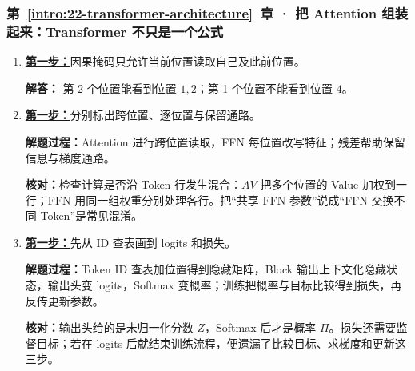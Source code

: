 \subsubsection*{第~\ref*{intro:22-transformer-architecture}~章 · 把 Attention 组装起来：Transformer 不只是一个公式}
\begin{enumerate}[label={},leftmargin=4.8em,itemsep=4pt]
\item[\textbf{C-067.}] \leavevmode{}\label{solution:C-067}\label{solution:causal-position-visibility}\hyperref[exercise:causal-position-visibility]{\textbf{第一步：}}因果掩码只允许当前位置读取自己及此前位置。\par\nobreak
\textbf{解答：} 第 2 个位置能看到位置 $1,2$；第 1 个位置不能看到位置 $4$。
\item[\textbf{C-068.}] \leavevmode{}\label{solution:C-068}\label{solution:block-branch-roles}\hyperref[exercise:block-branch-roles]{\textbf{第一步：}}分别标出跨位置、逐位置与保留通路。\par\nobreak\textbf{解题过程：}Attention 进行跨位置读取，FFN 每位置改写特征；残差帮助保留信息与梯度通路。\par\textbf{核对：}检查计算是否沿 Token 行发生混合：$AV$ 把多个位置的 Value 加权到一行；FFN 用同一组权重分别处理各行。把“共享 FFN 参数”说成“FFN 交换不同 Token”是常见混淆。
\item[\textbf{C-069.}] \leavevmode{}\label{solution:C-069}\label{solution:token-to-loss-pipeline}\hyperref[exercise:token-to-loss-pipeline]{\textbf{第一步：}}先从 ID 查表画到 logits 和损失。\par\nobreak\textbf{解题过程：}Token ID 查表加位置得到隐藏矩阵，Block 输出上下文化隐藏状态，输出头变 logits，Softmax 变概率；训练把概率与目标比较得到损失，再反传更新参数。\par\textbf{核对：}输出头给的是未归一化分数 $Z$，Softmax 后才是概率 $\Pi$。损失还需要监督目标；若在 logits 后就结束训练流程，便遗漏了比较目标、求梯度和更新这三步。
\end{enumerate}
